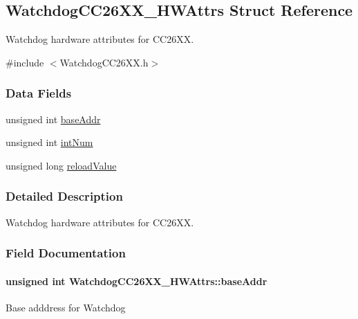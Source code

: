 \subsection{Watchdog\+C\+C26\+X\+X\+\_\+\+H\+W\+Attrs Struct Reference}
\label{struct_watchdog_c_c26_x_x___h_w_attrs}


Watchdog hardware attributes for C\+C26\+X\+X.  




{\ttfamily \#include $<$Watchdog\+C\+C26\+X\+X.\+h$>$}

\subsubsection*{Data Fields}
\begin{DoxyCompactItemize}
\item 
unsigned int \hyperlink{struct_watchdog_c_c26_x_x___h_w_attrs_a0eda34ad75c65e399e2c97ce3ee9bbc9}{base\+Addr}
\item 
unsigned int \hyperlink{struct_watchdog_c_c26_x_x___h_w_attrs_af18c0aa9b0cd8354d5f8a3dba21070be}{int\+Num}
\item 
unsigned long \hyperlink{struct_watchdog_c_c26_x_x___h_w_attrs_a4d5992495525d1457f5aa356046ce055}{reload\+Value}
\end{DoxyCompactItemize}


\subsubsection{Detailed Description}
Watchdog hardware attributes for C\+C26\+X\+X. 

\subsubsection{Field Documentation}
\paragraph[{base\+Addr}]{\setlength{\rightskip}{0pt plus 5cm}unsigned int Watchdog\+C\+C26\+X\+X\+\_\+\+H\+W\+Attrs\+::base\+Addr}\label{struct_watchdog_c_c26_x_x___h_w_attrs_a0eda34ad75c65e399e2c97ce3ee9bbc9}
Base adddress for Watchdog 
